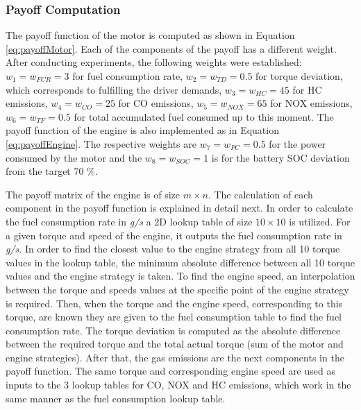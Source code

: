 \subsubsection{Payoff Computation}
The payoff function of the motor is computed as shown in Equation \ref{eq:payoffMotor}. Each of the components of the payoff has a different weight. After conducting experiments, the following weights were established: $w_1 = w_{FCR} = 3$ for fuel consumption rate, $w_2 = w_{TD} = 0.5$ for torque deviation, which corresponds to fulfilling the driver demands, $w_3 = w_{HC} = 45$ for HC emissions, $w_4 = w_{CO} = 25$ for CO emissions, $w_5 = w_{NOX} = 65$ for NOX emissions, $w_6 = w_{TF} = 0.5$ for total accumulated fuel consumed up to this moment.
The payoff function of the engine is also implemented as in Equation \ref{eq:payoffEngine}. The respective weights are $w_7 = w_{PC} = 0.5$ for the power consumed by the motor and the $w_8 = w_{SOC} = 1$ is for the battery SOC deviation from the target 70 \%.

The payoff matrix of the engine is of size $m \times n$. The calculation of each component in the payoff function is explained in detail next. In order to calculate the fuel consumption rate in \textit{g/s} a 2D lookup table of size $10 \times 10$ is utilized. For a given torque and speed of the engine, it outputs the fuel consumption rate in \textit{g/s}. In order to find the closest value to the engine strategy from all 10 torque values in the lookup table, the minimum absolute difference between all 10 torque values and the engine strategy is taken. To find the engine speed, an interpolation between the torque and speeds values at the specific point of the engine strategy is required. Then, when the torque and the engine speed, corresponding to this torque, are known they are given to the fuel consumption table to find the fuel consumption rate. The torque deviation is computed as the absolute difference between the required torque and the total actual torque (sum of the motor and engine strategies). After that, the gas emissions are the next components in the payoff function. The same torque and corresponding engine speed are used as inputs to the 3 lookup tables for CO, NOX and HC emissions, which work in the same manner as the fuel consumption lookup table.

